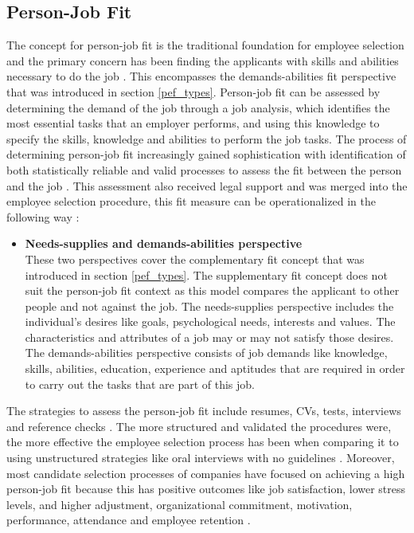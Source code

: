 \documentclass[draft,final]{thesisclass} %
\begin{document}
\subsection{Person-Job Fit}
The concept for person-job fit is the traditional foundation for employee selection and the primary concern has been finding the applicants with skills and abilities necessary to do the job \parencite[183]{po_and_pj_fit_literature_review}.
This encompasses the demands-abilities fit perspective that was introduced in section \ref{pef_types}.
Person-job fit can be assessed by determining the demand of the job through a job analysis, which identifies the most essential tasks that an employer performs, and using this knowledge to specify the skills, knowledge and abilities to perform the job tasks.
The process of determining person-job fit increasingly gained sophistication with identification of both statistically reliable and valid processes to assess the fit between the person and the job \parencite[183]{po_and_pj_fit_literature_review}.
This assessment also received legal support and was merged into the employee selection procedure, this fit measure can be operationalized in the following way \parencite[183-184]{po_and_pj_fit_literature_review}:
\begin{itemize}
    \item \textbf{Needs-supplies and demands-abilities perspective}\\
    These two perspectives cover the complementary fit concept that was introduced in section \ref{pef_types}.
    The supplementary fit concept does not suit the person-job fit context as this model compares the applicant to other people and not against the job.
    The needs-supplies perspective includes the individual's desires like goals, psychological needs, interests and values. The characteristics and attributes of a job may or may not satisfy those desires.
    The demands-abilities perspective consists of job demands like knowledge, skills, abilities, education, experience and aptitudes that are required in order to carry out the tasks that are part of this job.
\end{itemize}
The strategies to assess the person-job fit include resumes, \acs{CV}s, tests, interviews and reference checks \parencite[184]{po_and_pj_fit_literature_review}.
The more structured and validated the procedures were, the more effective the employee selection process has been when comparing it to using unstructured strategies like oral interviews with no guidelines \parencite[184]{po_and_pj_fit_literature_review}.
Moreover, most candidate selection processes of companies have focused on achieving a high person-job fit because this has positive outcomes like job satisfaction, lower stress levels, and higher adjustment, organizational commitment, motivation, performance, attendance and employee retention \parencite[184]{po_and_pj_fit_literature_review}.
\end{document}
